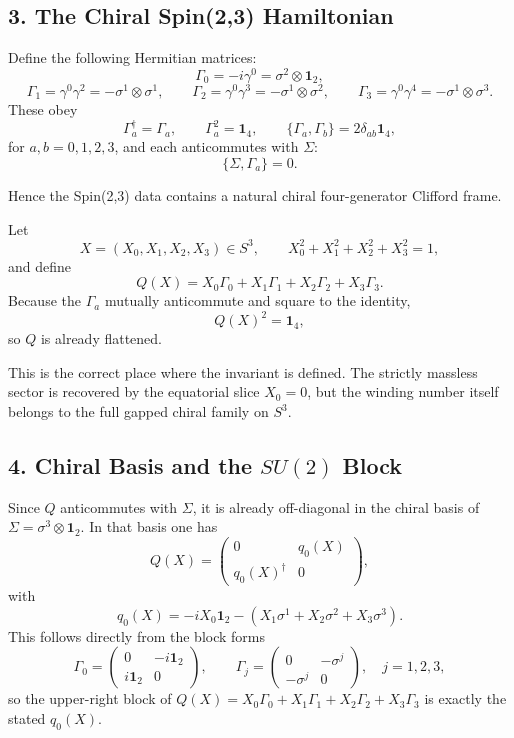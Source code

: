\documentclass[
]{article}
\begin{document}
\subsection{3. The Chiral Spin(2,3)
Hamiltonian}\label{the-chiral-spin23-hamiltonian}

Define the following Hermitian matrices: \[
\Gamma_0 = - i\gamma^0 = \sigma^2 \otimes \mathbf{1}_2,
\] \[
\Gamma_1 = \gamma^0\gamma^2 = - \sigma^1 \otimes \sigma^1,
\qquad
\Gamma_2 = \gamma^0\gamma^3 = - \sigma^1 \otimes \sigma^2,
\qquad
\Gamma_3 = \gamma^0\gamma^4 = - \sigma^1 \otimes \sigma^3.
\] These obey \[
\Gamma_a^\dagger = \Gamma_a,
\qquad
\Gamma_a^2 = \mathbf{1}_4,
\qquad
\{\Gamma_a,\Gamma_b\} = 2\delta_{ab}\mathbf{1}_4,
\] for \(a,b = 0,1,2,3\), and each anticommutes with \(\Sigma\): \[
\{\Sigma,\Gamma_a\} = 0.
\]

Hence the Spin(2,3) data contains a natural chiral four-generator
Clifford frame.

Let \[
X = (X_0,X_1,X_2,X_3) \in S^3,
\qquad
X_0^2 + X_1^2 + X_2^2 + X_3^2 = 1,
\] and define \[
Q(X) = X_0 \Gamma_0 + X_1 \Gamma_1 + X_2 \Gamma_2 + X_3 \Gamma_3.
\] Because the \(\Gamma_a\) mutually anticommute and square to the
identity, \[
Q(X)^2 = \mathbf{1}_4,
\] so \(Q\) is already flattened.

This is the correct place where the invariant is defined. The strictly
massless sector is recovered by the equatorial slice \(X_0 = 0\), but
the winding number itself belongs to the full gapped chiral family on
\(S^3\).

\subsection{\texorpdfstring{4. Chiral Basis and the \(SU(2)\)
Block}{4. Chiral Basis and the SU(2) Block}}\label{chiral-basis-and-the-su2-block}

Since \(Q\) anticommutes with \(\Sigma\), it is already off-diagonal in
the chiral basis of \(\Sigma = \sigma^3 \otimes \mathbf{1}_2\). In that
basis one has \[
Q(X)=
\begin{pmatrix}
0 & q_0(X) \\
q_0(X)^\dagger & 0
\end{pmatrix},
\] with \[
q_0(X)= -iX_0\mathbf{1}_2 - (X_1\sigma^1 + X_2\sigma^2 + X_3\sigma^3).
\] This follows directly from the block forms \[
\Gamma_0 =
\begin{pmatrix}
0 & -i\mathbf{1}_2 \\
i\mathbf{1}_2 & 0
\end{pmatrix},
\qquad
\Gamma_j =
\begin{pmatrix}
0 & -\sigma^j \\
-\sigma^j & 0
\end{pmatrix},
\quad j=1,2,3,
\] so the upper-right block of
\(Q(X)=X_0\Gamma_0+X_1\Gamma_1+X_2\Gamma_2+X_3\Gamma_3\) is exactly the
stated \(q_0(X)\).
\end{document}
